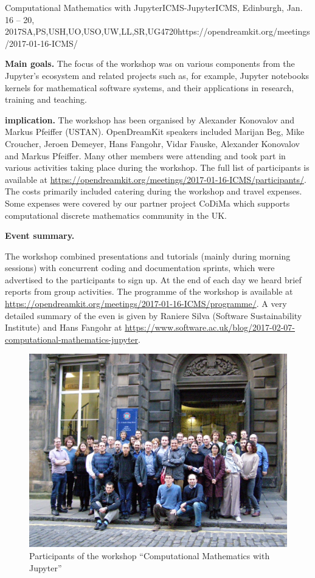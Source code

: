\begin{event}{Computational Mathematics with Jupyter}{ICMS-Jupyter}{ICMS, Edinburgh, Jan. 16 -- 20, 2017}{SA,PS,USH,UO,USO,UW,LL,SR,UG}{47}{20}{https://opendreamkit.org/meetings/2017-01-16-ICMS/}

\textbf{Main goals.} The focus of the workshop was on various components from the Jupyter's ecosystem
and related projects such as, for example, Jupyter notebooks kernels for mathematical software systems,
and their applications in research, training and teaching.

\textbf{\ODK implication.} The workshop has been organised by Alexander Konovalov and Markus
Pfeiffer (USTAN). OpenDreamKit speakers included Marijan Beg, Mike Croucher, Jeroen Demeyer,
Hans Fangohr, Vidar Fauske, Alexander Konovalov and Markus Pfeiffer. Many other \ODK members
were attending and took part in various activities taking place during the workshop.
The full list of participants is available at
\url{https://opendreamkit.org/meetings/2017-01-16-ICMS/participants/}.
The costs primarily included catering during the workshop and travel expenses.
Some expenses were covered by our partner project CoDiMa which supports computational
discrete mathematics community in the UK.

\textbf{Event summary.}

The workshop combined presentations and tutorials (mainly during morning sessions)
with concurrent coding and documentation sprints, which were advertised to the participants
to sign up. At the end of each day we heard brief reports from group activities.
The programme of the workshop is available
at \url{https://opendreamkit.org/meetings/2017-01-16-ICMS/programme/}. A very detailed
summary of the even is given by Raniere Silva (Software Sustainability Institute) and
Hans Fangohr at \url{https://www.software.ac.uk/blog/2017-02-07-computational-mathematics-jupyter}.

\begin{figure}[ht]
\includegraphics[scale=.14]{ICMS_Jan2017.jpg}
\caption*{Participants of the workshop ``Computational Mathematics with Jupyter''}
\end{figure}

\end{event}
